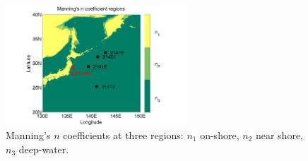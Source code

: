\begin{figure}[ht]      
\centering
\includegraphics[width=0.6\textwidth]{./figures/coef.pdf}
\caption{Manning's $n$ coefficients at three regions: $n_1$ on-shore, $n_2$ near shore, $n_3$ deep-water.}
\label{fig:ceofs}
\end{figure}  

